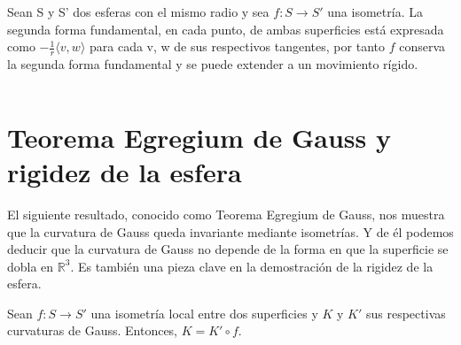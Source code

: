 \begin{ejemplo}
	Sean S y S' dos esferas con el mismo radio y sea $f : S \to S'$ una isometría. La segunda forma fundamental, en cada punto, de ambas superficies está expresada como $-\frac{1}{r} \langle v,w \rangle$ para cada v, w de sus respectivos tangentes, por tanto $f$ conserva la segunda forma fundamental y se puede extender a un movimiento rígido.
\end{ejemplo}
${ }$\\


	${ }$\\
\section{Teorema Egregium de Gauss y rigidez de la esfera}
	${ }$\\

El siguiente resultado, conocido como Teorema Egregium de Gauss, nos muestra que la curvatura de Gauss queda invariante mediante isometrías. Y de él podemos deducir que la curvatura de Gauss no depende de la forma en que la superficie se dobla en $\mathbb{R}^3$. Es también una pieza clave en la demostración de la rigidez de la esfera.
${ }$\\

\begin{teorema} \label{teo:egre}
	Sean $f : S \to S'$ una isometría local entre dos superficies y $K$ y $K'$ sus respectivas curvaturas de Gauss. Entonces, $K = K'\circ f$.
\end{teorema}

